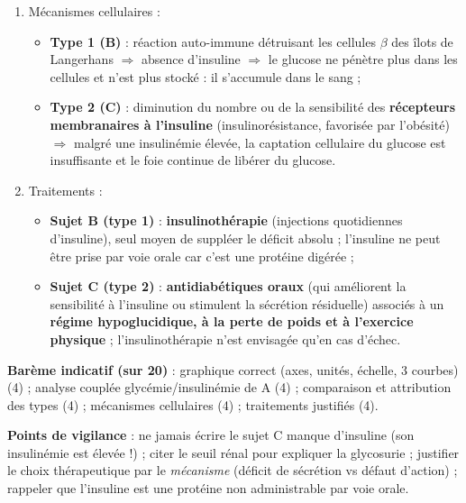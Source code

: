 \documentclass[11pt]{article}
\begin{document}
\begin{corrige}
\begin{enumerate}
\begin{itemize}
\item \textbf{Sujet C} : insulinémie \emph{supérieure} à celle de A (15 à \SI{90}{\mu UI/mL}) malgré une hyperglycémie persistante $\Rightarrow$ \textbf{diabète de type 2} : l'insuline est sécrétée (voire en excès compensateur) mais inefficace, car les cellules cibles y sont résistantes.
\end{itemize}
\item Mécanismes cellulaires :
\begin{itemize}
\item \textbf{Type 1 (B)} : réaction auto-immune détruisant les cellules $\beta$ des îlots de Langerhans $\Rightarrow$ absence d'insuline $\Rightarrow$ le glucose ne pénètre plus dans les cellules et n'est plus stocké : il s'accumule dans le sang ;
\item \textbf{Type 2 (C)} : diminution du nombre ou de la sensibilité des \textbf{récepteurs membranaires à l'insuline} (insulinorésistance, favorisée par l'obésité) $\Rightarrow$ malgré une insulinémie élevée, la captation cellulaire du glucose est insuffisante et le foie continue de libérer du glucose.
\end{itemize}
\item Traitements :
\begin{itemize}
\item \textbf{Sujet B (type 1)} : \textbf{insulinothérapie} (injections quotidiennes d'insuline), seul moyen de suppléer le déficit absolu ; l'insuline ne peut être prise par voie orale car c'est une protéine digérée ;
\item \textbf{Sujet C (type 2)} : \textbf{antidiabétiques oraux} (qui améliorent la sensibilité à l'insuline ou stimulent la sécrétion résiduelle) associés à un \textbf{régime hypoglucidique, à la perte de poids et à l'exercice physique} ; l'insulinothérapie n'est envisagée qu'en cas d'échec.
\end{itemize}
\end{enumerate}
\textbf{Barème indicatif (sur 20)} : graphique correct (axes, unités, échelle, 3 courbes) (4) ; analyse couplée glycémie/insulinémie de A (4) ; comparaison et attribution des types (4) ; mécanismes cellulaires (4) ; traitements justifiés (4).

\textbf{Points de vigilance} : ne jamais écrire \og le sujet C manque d'insuline \fg{} (son insulinémie est élevée !) ; citer le seuil rénal pour expliquer la glycosurie ; justifier le choix thérapeutique par le \emph{mécanisme} (déficit de sécrétion vs défaut d'action) ; rappeler que l'insuline est une protéine non administrable par voie orale.
\end{corrige}
\end{document}
